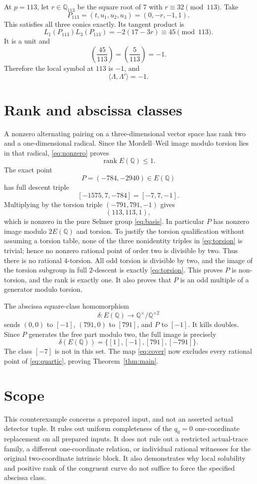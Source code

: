 \documentclass[11pt,a4paper]{article}
\newcommand{\Q}{\mathbb Q}
\begin{document}
At $p=113$, let $r\in\Q_{113}$ be the square root of $7$ with $r\equiv32\pmod{113}$. Take
\[
 P_{113}=(t,u_1,u_2,u_3)=(0,-r,-1,1).
\]
This satisfies all three conics exactly. Its tangent product is
\[
 L_1(P_{113})L_3(P_{113})=-2(17-3r)
 \equiv45\pmod{113}.
\]
It is a unit and
\[
 \left(\frac{45}{113}\right)=\left(\frac5{113}\right)=-1.
\]
Therefore the local symbol at $113$ is $-1$, and
\begin{equation}\label{eq:nonzero}
 \boxed{\langle\Lambda,\Lambda'\rangle=-1.}
\end{equation}

\section{Rank and abscissa classes}
A nonzero alternating pairing on a three-dimensional vector space has rank two and a one-dimensional radical. Since the Mordell--Weil image modulo torsion lies in that radical, \eqref{eq:nonzero} proves
\[
 \operatorname{rank}E(\Q)\le1.
\]
The exact point
\[
 P=(-784,-2940)\in E(\Q)
\]
has full descent triple
\[
 [-1575,7,-784]=[-7,7,-1].
\]
Multiplying by the torsion triple $(-791,791,-1)$ gives
\[
 (113,113,1),
\]
which is nonzero in the pure Selmer group \eqref{eq:basis}. In particular $P$ has nonzero image modulo $2E(\Q)$ and torsion. To justify the torsion qualification without assuming a torsion table, none of the three nonidentity triples in \eqref{eq:torsion} is trivial; hence no nonzero rational point of order two is divisible by two. Thus there is no rational $4$-torsion. All odd torsion is divisible by two, and the image of the torsion subgroup in full $2$-descent is exactly \eqref{eq:torsion}. This proves $P$ is non-torsion, and the rank is exactly one. It also proves that $P$ is an odd multiple of a generator modulo torsion.

The abscissa square-class homomorphism
\[
 \delta:E(\Q)\to\Q^\times/\Q^{\times2}
\]
sends $(0,0)$ to $[-1]$, $(791,0)$ to $[791]$, and $P$ to $[-1]$. It kills doubles. Since $P$ generates the free part modulo two, the full image is precisely
\[
 \delta(E(\Q))=\{[1],[-1],[791],[-791]\}.
\]
The class $[-7]$ is not in this set. The map \eqref{eq:cover} now excludes every rational point of \eqref{eq:quartic}, proving Theorem~\ref{thm:main}.

\section{Scope}
This counterexample concerns a prepared input, and not an asserted actual detector tuple. It rules out uniform completeness of the $q_0=0$ one-coordinate replacement on all prepared inputs. It does not rule out a restricted actual-trace family, a different one-coordinate relation, or individual rational witnesses for the original two-coordinate intrinsic block. It also demonstrates why local solubility and positive rank of the congruent curve do not suffice to force the specified abscissa class.
\end{document}
